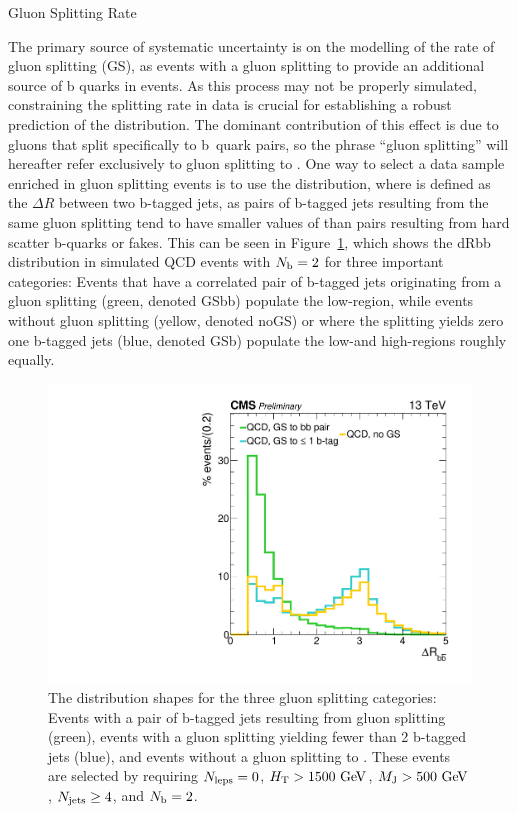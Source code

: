 \begin{section}{Gluon Splitting Rate}

The primary source of systematic uncertainty is on the modelling of the rate of gluon splitting (GS), as events with a gluon splitting to \bbbar provide an additional source of b quarks in events.
As this process may not be properly simulated, constraining the splitting rate in data is crucial for establishing a robust prediction of the \Nb distribution.
The dominant contribution of this effect is due to gluons that split specifically to b~quark pairs, so the phrase ``gluon splitting'' will hereafter refer exclusively to gluon splitting to \bbbar.
One way to select a data sample enriched in gluon splitting events is to use the \dRbb distribution, where \dRbb is defined as the $\Delta R$ between two b-tagged jets, as pairs of b-tagged jets resulting from the same gluon splitting tend to have smaller values of \dRbb than pairs resulting from hard scatter b-quarks or fakes.
This can be seen in Figure~\ref{fig:dRbb_shapes}, which shows the dRbb distribution in simulated QCD events with $N_{\mathrm{b}} = 2$ for three important categories:
Events that have a correlated pair of b-tagged jets originating from a gluon splitting (green, denoted GSbb) populate the low-\dRbb region, while events without gluon splitting (yellow, denoted noGS) or where the splitting yields zero one b-tagged jets (blue, denoted GSb) populate the low-and high-\dRbb regions roughly equally.

\begin{figure}[tbp!]
\begin{center}
\includegraphics[angle=0,width=0.60\columnwidth]{fig/dRbb_shapes.pdf}
\end{center}
\caption{The \dRbb distribution shapes for the three gluon splitting categories: 
Events with a pair of b-tagged jets resulting from gluon splitting (green), events with a gluon splitting yielding fewer than 2 b-tagged jets (blue), and events without a gluon splitting to \bbbar.
These events are selected by requiring $N_{\mathrm{leps}} = 0$, $H_{\mathrm{T}} > 1500~\mathrm{Ge\kern -0.1em V}$, $M_{\mathrm{J}} > 500~\mathrm{Ge\kern -0.1em V}$, $N_{\mathrm{jets}} \geq 4$, and $N_{\mathrm{b}} = 2$.}
\label{fig:dRbb_shapes}
\end{figure}


\end{section}
